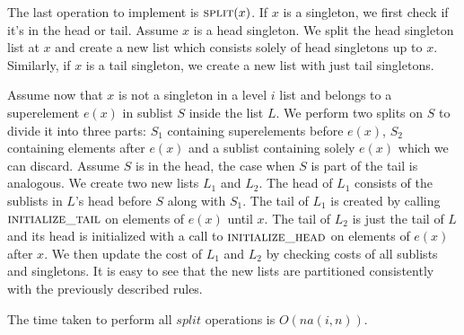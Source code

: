 The last operation to implement is $\textsc{split}(x)$. If $x$ is a singleton, we first check if it's in the head or tail. Assume $x$ is a head singleton. We split the head singleton list at $x$ and create a new list which consists solely of head singletons up to $x$. Similarly, if $x$ is a tail singleton, we create a new list with just tail singletons.

Assume now that $x$ is not a singleton in a level $i$ list and belongs to a superelement $e(x)$ in sublist $S$ inside the list $L$. We perform two splits on $S$ to divide it into three parts: $S_1$ containing superelements before $e(x)$, $S_2$ containing elements after $e(x)$ and a sublist containing solely $e(x)$ which we can discard. Assume $S$ is in the head, the case when $S$ is part of the tail is analogous. We create two new lists $L_1$ and $L_2$. The head of $L_1$ consists of the sublists in $L$'s head before $S$ along with $S_1$. The tail of $L_1$ is created by calling $\textsc{initialize\_tail}$ on elements of $e(x)$ until $x$. The tail of $L_2$ is just the tail of $L$ and its head is initialized with a call to $\textsc{initialize\_head}$ on elements of $e(x)$ after $x$. We then update the cost of $L_1$ and $L_2$ by checking costs of all sublists and singletons. It is easy to see that the new lists are partitioned consistently with the previously described rules.

\begin{theorem}
    The time taken to perform all $split$ operations is $O(na(i,n))$.
\end{theorem}

